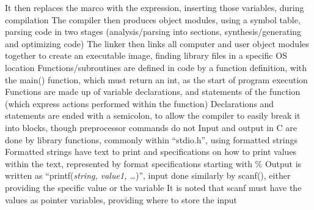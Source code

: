 \documentclass[11 pt, twoside]{article}
\newenvironment{outline*}
{
	\begin{outline}[enumerate]
	}
	{\end{outline}
}
\begin{document}
\begin{outline*}
\4 It then replaces the marco with the expression, inserting those variables, during compilation
\2 The compiler then produces object modules, using a symbol table, parsing code in two stages (analysis/parsing into sections, synthesis/generating and optimizing code)
\2 The linker then links all computer and user object modules together to create an executable image, finding library files in a specific OS location
\1 Functions/subroutines are defined in code by a function definition, with the main() function, which must return an int, as the start of program execution
\2 Functions are made up of variable declarations, and statements of the function (which express actions performed within the function)
\2 Declarations and statements are ended with a semicolon, to allow the compiler to easily break it into blocks, though preprocessor commands do not
\1 Input and output in C are done by library functions, commonly within ``stdio.h'', using formatted strings
\2 Formatted strings have text to print and specifications on how to print values within the text, represented by format specifications starting with \%
\2 Output is written as ``printf(\textit{string, value1, \dots})'', input done similarly by scanf(), either providing the specific value or the variable
\3 It is noted that scanf must have the values as pointer variables, providing where to store the input
\end{outline*}
\end{document}
